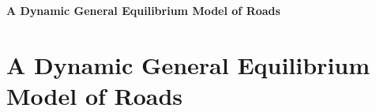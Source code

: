 \documentclass[12pt]{article}
\begin{document}
\begin{titlepage}
\centering
\vspace*{\fill} %
{\huge \bfseries A Dynamic General Equilibrium Model of Roads}
\vspace*{\fill} %
\end{titlepage}

\setcounter{page}{1}
\section{A Dynamic General Equilibrium Model of Roads} \label{sec:model}


\singlespacing
\setlength\bibsep{0pt}

% 



\clearpage

\clearpage









\clearpage

\end{document}
